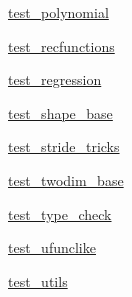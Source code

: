 \begin{DoxyCompactItemize}
\item 
 \hyperlink{namespacenumpy_1_1lib_1_1tests_1_1test__polynomial}{test\+\_\+polynomial}
\item 
 \hyperlink{namespacenumpy_1_1lib_1_1tests_1_1test__recfunctions}{test\+\_\+recfunctions}
\item 
 \hyperlink{namespacenumpy_1_1lib_1_1tests_1_1test__regression}{test\+\_\+regression}
\item 
 \hyperlink{namespacenumpy_1_1lib_1_1tests_1_1test__shape__base}{test\+\_\+shape\+\_\+base}
\item 
 \hyperlink{namespacenumpy_1_1lib_1_1tests_1_1test__stride__tricks}{test\+\_\+stride\+\_\+tricks}
\item 
 \hyperlink{namespacenumpy_1_1lib_1_1tests_1_1test__twodim__base}{test\+\_\+twodim\+\_\+base}
\item 
 \hyperlink{namespacenumpy_1_1lib_1_1tests_1_1test__type__check}{test\+\_\+type\+\_\+check}
\item 
 \hyperlink{namespacenumpy_1_1lib_1_1tests_1_1test__ufunclike}{test\+\_\+ufunclike}
\item 
 \hyperlink{namespacenumpy_1_1lib_1_1tests_1_1test__utils}{test\+\_\+utils}
\end{DoxyCompactItemize}

